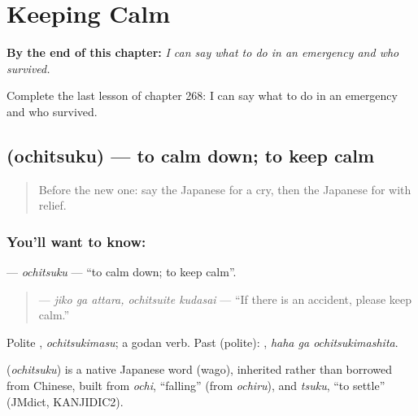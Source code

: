
\chapter{Keeping Calm}
\label{ch:ja-keeping-calm}

\begin{chapteropening}
\textbf{By the end of this chapter:} \emph{I can say what to do in an emergency and who survived.}

Complete the last lesson of chapter 268: I can say what to do in an emergency and who survived.
\end{chapteropening}

\section[\texorpdfstring{\ja{おちつく} (ochitsuku)}{おちつく (ochitsuku)}]{ (ochitsuku) — to calm down; to keep calm}

\label{lesson:JA-C268-ochitsuku}



\begin{quote}
Before the new one: say the Japanese for a cry, then the Japanese for with relief.
\end{quote}

\subsection*{You'll want to know: }
\textbf{} — \emph{ochitsuku} — \textquotedblleft{}to calm down; to keep calm\textquotedblright{}.

\begin{quote}
\textbf{  } — \emph{jiko ga attara, ochitsuite kudasai} — \textquotedblleft{}If there is an accident, please keep calm.\textquotedblright{}
\end{quote}

Polite \textbf{}, \emph{ochitsukimasu}; a godan verb. Past (polite): \textbf{ }, \emph{haha ga ochitsukimashita}.

\begin{cousinweb}
\textbf{} (\emph{ochitsuku}) is a native Japanese word (wago), inherited rather than borrowed from Chinese, built from \emph{ochi}, \textquotedblleft{}falling\textquotedblright{} (from \emph{ochiru}), and \emph{tsuku}, \textquotedblleft{}to settle\textquotedblright{} (JMdict, KANJIDIC2).
\end{cousinweb}

